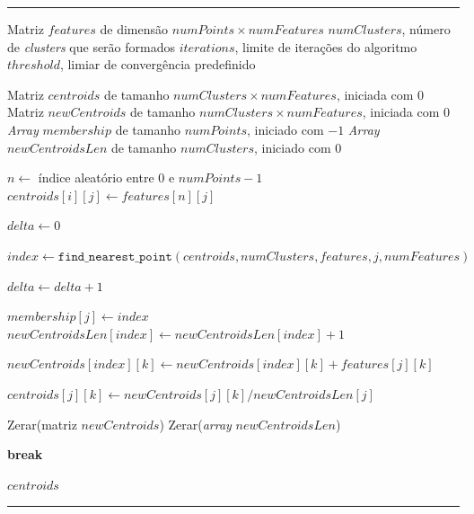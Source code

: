 \begin{sourcecode}[htb!]
    \caption{Algoritmo K-means.}
    \label{alg:kmeans}
    \hrule
    \begin{algorithmic}[1]
        \REQUIRE Matriz $features$ de dimensão $numPoints \times numFeatures$
        \REQUIRE $numClusters$, número de \textit{clusters} que serão formados
        \REQUIRE $iterations$, limite de iterações do algoritmo
        \REQUIRE $threshold$, limiar de convergência predefinido

        \STATE Matriz $centroids$ de tamanho $numClusters \times numFeatures$, iniciada com $0$
        \STATE Matriz $newCentroids$ de tamanho $numClusters \times numFeatures$, iniciada com $0$
        \STATE \textit{Array} $membership$ de tamanho $numPoints$, iniciado com $-1$
        \STATE \textit{Array} $newCentroidsLen$ de tamanho $numClusters$, iniciado com $0$

            \STATE $n \gets$ índice aleatório entre $0$ e $numPoints - 1$
                \STATE $centroids[i][j] \gets features[n][j]$
            \ENDFOR
        \ENDFOR

            \STATE $delta \gets 0$

                \STATE $index \gets \texttt{find\_nearest\_point}(centroids, numClusters, features, j, numFeatures)$

                    \STATE $delta \gets delta + 1$
                \ENDIF

                \STATE $membership[j] \gets index$
                \STATE $newCentroidsLen[index] \gets newCentroidsLen[index] + 1$

                    \STATE $newCentroids[index][k] \gets newCentroids[index][k] + features[j][k]$
                \ENDFOR
            \ENDFOR

                        \STATE $centroids[j][k] \gets newCentroids[j][k] / newCentroidsLen[j]$
                    \ENDFOR
                \ENDIF
            \ENDFOR

            \STATE Zerar(matriz $newCentroids$)
            \STATE Zerar(\textit{array} $newCentroidsLen$)

                \STATE \textbf{break}
            \ENDIF
        \ENDFOR

        \RETURN $centroids$
    \end{algorithmic}
    \hrule
\end{sourcecode}

